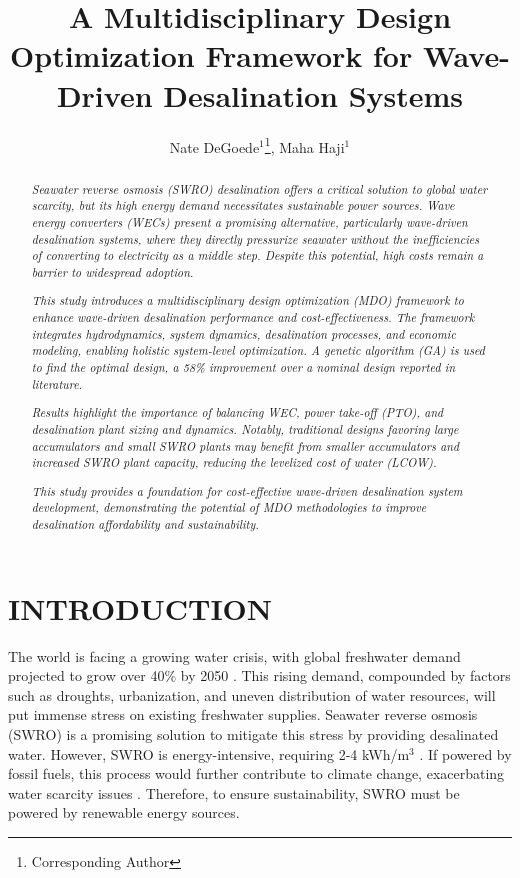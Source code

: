 \documentclass[twocolumn,10pt]{asme2e}
\title{ \vspace{-10 mm} A Multidisciplinary Design Optimization Framework for Wave-Driven Desalination Systems}
\author{Nate DeGoede$^1$\thanks{Corresponding Author}, Maha Haji$^1$
    \affiliation{
	$^1$Sibley School of Mechanical and Aerospace Engineering\\
	Cornell University\\
	Ithaca, New York 14853\\
    Email: \{njd76, maha\}@cornell.edu 
    }
}
\begin{document}
\maketitle

\setlength{\abovedisplayskip}{10pt}
\setlength{\belowdisplayskip}{10pt}

\begin{abstract}

\textit{Seawater reverse osmosis (SWRO) desalination offers a critical solution to global water scarcity, but its high energy demand necessitates sustainable power sources. Wave energy converters (WECs) present a promising alternative, particularly wave-driven desalination systems, where they directly pressurize seawater without the inefficiencies of converting to electricity as a middle step. Despite this potential, high costs remain a barrier to widespread adoption.} 

\textit{This study introduces a multidisciplinary design optimization (MDO) framework to enhance wave-driven desalination performance and cost-effectiveness. The framework integrates hydrodynamics, system dynamics, desalination processes, and economic modeling, enabling holistic system-level optimization. A genetic algorithm (GA) is used to find the optimal design, a 58\% improvement over a nominal design reported in literature.} 

\textit{Results highlight the importance of balancing WEC, power take-off (PTO), and desalination plant sizing and dynamics. Notably, traditional designs favoring large accumulators and small SWRO plants may benefit from smaller accumulators and increased SWRO plant capacity, reducing the levelized cost of water (LCOW).}

\textit{This study provides a foundation for cost-effective wave-driven desalination system development, demonstrating the potential of MDO methodologies to improve desalination affordability and sustainability.}

\end{abstract}


\section{INTRODUCTION}

The world is facing a growing water crisis, with global freshwater demand projected to grow over 40\% by 2050 \cite{watershortage2015}. This rising demand, compounded by factors such as droughts, urbanization, and uneven distribution of water resources, will put immense stress on existing freshwater supplies. Seawater reverse osmosis (SWRO) is a promising solution to mitigate this stress by providing desalinated water. However, SWRO is energy-intensive, requiring 2-4 kWh/m$^3$ \cite{Li2018}. If powered by fossil fuels, this process would further contribute to climate change, exacerbating water scarcity issues \cite{nytdrought}. Therefore, to ensure sustainability, SWRO must be powered by renewable energy sources. 
\end{document}
